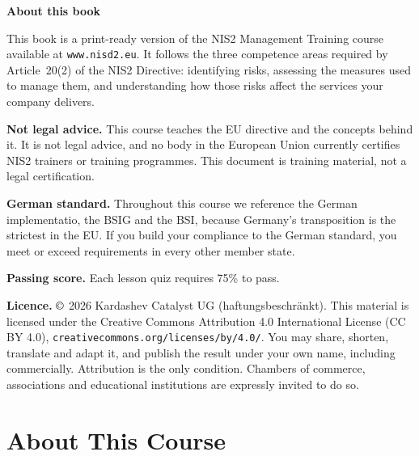 \documentclass[11pt,a4paper,twoside]{book}
\begin{document}
\thispagestyle{empty}
\vspace*{\fill}
\begin{small}
\noindent\textbf{About this book}

This book is a print-ready version of the NIS2 Management Training course available at \texttt{www.nisd2.eu}. It follows the three competence areas required by Article~20(2) of the NIS2 Directive: identifying risks, assessing the measures used to manage them, and understanding how those risks affect the services your company delivers.

\vspace{6pt}
\noindent\textbf{Not legal advice.} This course teaches the EU directive and the concepts behind it. It is not legal advice, and no body in the European Union currently certifies NIS2 trainers or training programmes. This document is training material, not a legal certification.

\vspace{6pt}
\noindent\textbf{German standard.} Throughout this course we reference the German implementatio, the BSIG and the BSI, because Germany's transposition is the strictest in the EU. If you build your compliance to the German standard, you meet or exceed requirements in every other member state.

\vspace{6pt}
\noindent\textbf{Passing score.} Each lesson quiz requires 75\% to pass.

\vspace{6pt}
\noindent\textbf{Licence.} $\copyright$ 2026 Kardashev Catalyst UG (haftungsbeschränkt). This material is licensed under the Creative Commons Attribution 4.0 International License (CC BY 4.0), \texttt{creativecommons.org/licenses/by/4.0/}. You may share, shorten, translate and adapt it, and publish the result under your own name, including commercially. Attribution is the only condition. Chambers of commerce, associations and educational institutions are expressly invited to do so.
\end{small}
\vspace*{\fill}
\newpage

\tableofcontents
\newpage


\chapter*{About This Course}
\end{document}
